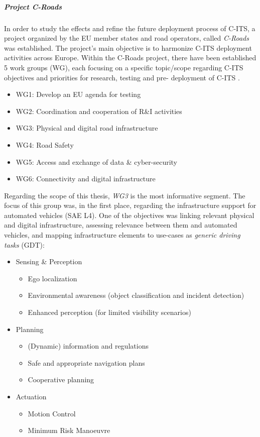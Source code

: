 \documentclass[main.tex]{subfiles}
\begin{document}
\subparagraph{Project C-Roads}\label{sec-croads}

In order to study the effects and refine the future deployment process of C-ITS, a project 
organized by the EU member states and road operators, called \emph{C-Roads} was established. 
The project's main objective is to harmonize C-ITS deployment activities across Europe. 
Within the C-Roads project, there have been established 5 work groups (WG), each focusing on a 
specific topic/scope regarding C-ITS objectives and priorities for research, testing and pre-
deployment of C-ITS \cite{Commision2021}. 

\begin{itemize}
    \item WG1: Develop an EU agenda for testing
    \item WG2: Coordination and cooperation of R\&I activities
    \item WG3: Physical and digital road infrastructure
    \item WG4: Road Safety
    \item WG5: Access and exchange of data \& cyber-security
    \item WG6: Connectivity and digital infrastructure
\end{itemize}

Regarding the scope of this thesis, \emph{WG3} is the most informative segment. The focus of this group 
was, in the first place, regarding the infrastructure support for automated vehicles (SAE L4). One of 
the objectives was linking relevant physical and digital infrastructure, assessing relevance between 
them and automated vehicles, and mapping infrastructure elements to use-cases as \emph{generic driving 
tasks} (GDT):

\begin{itemize}
    \item Sensing \& Perception
    \begin{itemize}
        \item Ego localization
        \item Environmental awareness (object classification and incident detection)
        \item Enhanced perception (for limited visibility scenarios)
    \end{itemize}
    \item Planning
    \begin{itemize}
        \item (Dynamic) information and regulations
        \item Safe and appropriate navigation plans
        \item Cooperative planning
    \end{itemize}
    \item Actuation
    \begin{itemize}
        \item Motion Control
        \item Minimum Risk Manoeuvre
    \end{itemize}
\end{itemize}
\end{document}

